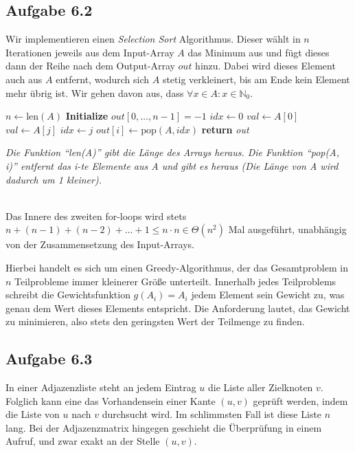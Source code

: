 \documentclass{article}
\begin{document}
    \subsection*{Aufgabe 6.2}
    Wir implementieren einen \textit{Selection Sort} Algorithmus. Dieser wählt in $n$ Iterationen jeweils aus dem Input-Array $A$ das Minimum aus und fügt dieses dann der Reihe nach dem Output-Array $out$ hinzu. Dabei wird dieses Element auch aus $A$ entfernt, wodurch sich $A$ stetig verkleinert, bis am Ende kein Element mehr übrig ist. Wir gehen davon aus, dass $\forall x \in A: x \in \mathbb{N}_0$.
    \begin{algorithm}
        \begin{algorithmic}[1]
            \State $n \gets \text{len}(A)$
            \State \textbf{Initialize} $out[0, \ldots, n-1] = -1$
                \State $idx \gets 0$
                \State $val \gets A[0]$
                        \State $val \gets A[j]$
                        \State $idx \gets j$
                    \EndIf
                \EndFor
                \State $out[i] \gets \text{pop}(A, idx)$
            \EndFor
            \State \textbf{return} \textit{out}
            \EndProcedure
            \end{algorithmic}
    \textit{Die Funktion "`len(A)"' gibt die Länge des Arrays heraus. Die Funktion "`pop(A, i)"' entfernt das i-te Elemente aus A und gibt es heraus (Die Länge von A wird dadurch um 1 kleiner).}
    \end{algorithm}\\
    Das Innere des zweiten for-loops wird stets $n+(n-1)+(n-2)+\ldots+1 \leq n\cdot n \in \Theta(n^2)$ Mal ausgeführt, unabhängig von der Zusammensetzung des Input-Arrays.  

    Hierbei handelt es sich um einen Greedy-Algorithmus, der das Gesamtproblem in $n$ Teilprobleme immer kleinerer Größe unterteilt. Innerhalb jedes Teilproblems schreibt die Gewichtsfunktion $g(A_i) = A_i$ jedem Element sein Gewicht zu, was genau dem Wert dieses Elements entspricht. Die Anforderung lautet, das Gewicht zu minimieren, also stets den geringsten Wert der Teilmenge zu finden. 


    \subsection*{Aufgabe 6.3}
    In einer Adjazenzliste steht an jedem Eintrag $u$ die Liste aller Zielknoten $v$. Folglich kann eine das Vorhandensein einer Kante $(u, v)$ geprüft werden, indem die Liste von $u$ nach $v$ durchsucht wird. Im schlimmsten Fall ist diese Liste $n$ lang. Bei der Adjazenzmatrix hingegen geschieht die Überprüfung in einem Aufruf, und zwar exakt an der Stelle $(u,v)$. 
\end{document}
